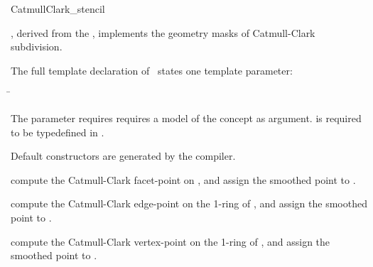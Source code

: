 \begin{ccRefClass}{CatmullClark_stencil}

\ccDefinition

\ccClassTemplateName , derived from the ,
implements the geometry masks of Catmull-Clark subdivision. 


\ccParameters

The full template declaration of \ccClassTemplateName\ states one
template parameter:

\begin{tabbing}
 \=\\
\end{tabbing}
   
The  parameter requires requires a model of 
the  concept as argument. 
 is required to be typedefined in .

\ccCreation

Default constructors are generated by the compiler.

\ccThree{}{}{}

{compute the Catmull-Clark facet-point on , 
and assign the smoothed point to .}

{compute the Catmull-Clark edge-point on the 1-ring
of , and assign the smoothed point to .}

{compute the Catmull-Clark vertex-point on the 
1-ring of , and assign the smoothed point to .}


\ccSeeAlso

\\
\\
\\

\end{ccRefClass}

\ccRefPageEnd


